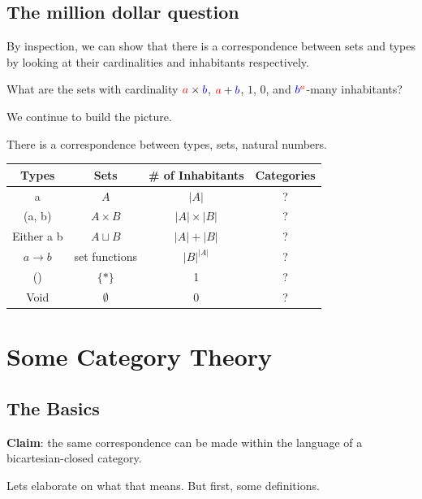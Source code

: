 \documentclass[tikz]{beamer}
\newcommand{\red}[1]{\textcolor{red}{#1}}
\newcommand{\blue}[1]{\textcolor{blue}{#1}}
\theoremstyle{definition}
\begin{document}
\subsection{The million dollar question}

\frame
{ 
	By inspection, we can show that there is a correspondence between sets and types by looking at their cardinalities and inhabitants respectively. 
}

\frame
{
	What are the sets with cardinality $\red{a} \times \blue{b}$, $\red{a} + \blue{b}$, $1$, $0$, and $\blue{b}^{\red{a}}$-many inhabitants? 
}

\frame
{
	We continue to build the picture.
}

\begin{frame}
There is a correspondence between types, sets, natural numbers.
\begin{center}
\begin{tabular}{|c|c|c|c|}
\hline
Types & Sets & \# of Inhabitants & Categories \\
\hline
a       & $A$ & $|A|$  & ? \\
(a, b) & $A \times B$ & $|A| \times |B|$ & ? \\
Either a b & $A \sqcup B$ & $|A| + |B|$ & ? \\
$a \to b$ &  set functions & $|B|^{|A|}$ & ? \\
() & $\{*\}$ & 1 & ? \\
Void & $\emptyset$ & 0 & ? \\ \hline
\end{tabular}
\end{center}
\end{frame}

\section{Some Category Theory}


\subsection{The Basics}

\frame
{
	\textbf{Claim}: the same correspondence can be made within the language of a bicartesian-closed category. 
}

\frame
{
	Lets elaborate on what that means. But first, some definitions.
}
\end{document}
